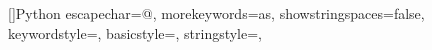 \usepackage{listings}
\renewcommand{\lstlistingname}{Quelltext}
\renewcommand{\lstlistlistingname}{Quelltextverzeichnis}

\newcommand{\colorClasses}{\color{PineGreen}}
\newcommand{\colorInterfaces}{\color{DarkOrchid}}
\newcommand{\colorMethods}{\color{Orange}}
\newcommand{\colorKeyword}{\color{blue}}

[]{Python}{
  escapechar=@,
  morekeywords={as},
  showstringspaces=false,
  keywordstyle=\color{blue},
  basicstyle={\scriptsize{}\selectfont},
  stringstyle=\color{orange},
}

\lstset{
  columns=fullflexible,
  language=mypy,
  xleftmargin=2em
}

